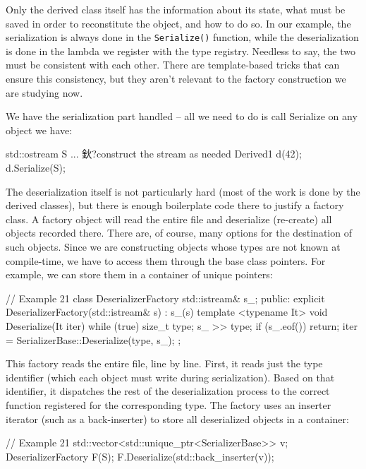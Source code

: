 Only the derived class itself has the information about its state, what must be saved in order to reconstitute the object, and how to do so. In our example, the serialization is always done in the \texttt{Serialize()} function, while the deserialization is done in the lambda we register with the type registry. Needless to say, the two must be consistent with each other. There are template-based tricks that can ensure this consistency, but they aren't relevant to the factory construction we are studying now.

We have the serialization part handled -- all we need to do is call Serialize on any object we have:

\begin{code}
std::ostream S ... 鈥?construct the stream as needed
Derived1 d(42);
d.Serialize(S);
\end{code}

The deserialization itself is not particularly hard (most of the work is done by the derived classes), but there is enough boilerplate code there to justify a factory class. A factory object will read the entire file and deserialize (re-create) all objects recorded there. There are, of course, many options for the destination of such objects. Since we are constructing objects whose types are not known at compile-time, we have to access them through the base class pointers. For example, we can store them in a container of unique pointers:

\begin{code}
// Example 21
class DeserializerFactory {
  std::istream& s_;
  public:
  explicit DeserializerFactory(std::istream& s) : s_(s) {}
  template <typename It>
  void Deserialize(It iter) {
    while (true) {
      size_t type;
      s_ >> type;
      if (s_.eof()) return;
      iter = SerializerBase::Deserialize(type, s_);
    }
  }
};
\end{code}

This factory reads the entire file, line by line. First, it reads just the type identifier (which each object must write during serialization). Based on that identifier, it dispatches the rest of the deserialization process to the correct function registered for the corresponding type. The factory uses an inserter iterator (such as a back-inserter) to store all deserialized objects in a container:

\begin{code}
// Example 21
std::vector<std::unique_ptr<SerializerBase>> v;
DeserializerFactory F(S);
F.Deserialize(std::back_inserter(v));
\end{code}

